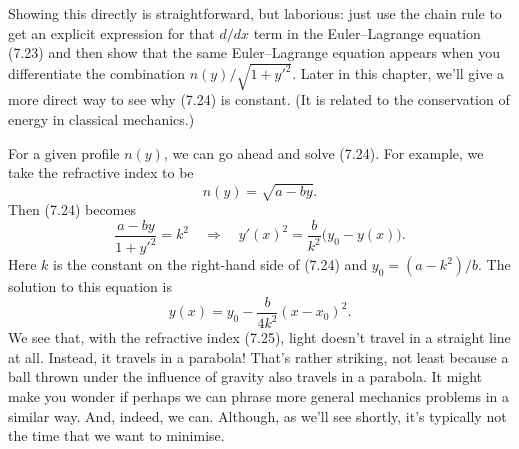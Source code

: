 \documentclass[11pt,a4paper,twoside]{article}
\newcommand{\pnum}[1]{\makebox[0pt][r]{\scriptsize\textbf{[#1]}\hspace{0.7em}}}
\begin{document}
\noindent\pnum{38}Showing this directly is straightforward, but laborious: just use the chain rule to get an explicit expression for that $d/dx$ term in the Euler--Lagrange equation (7.23) and then show that the same Euler--Lagrange equation appears when you differentiate the combination $n(y)/\sqrt{1+y'^2}$. Later in this chapter, we'll give a more direct way to see why (7.24) is constant. (It is related to the conservation of energy in classical mechanics.)

\noindent\pnum{39}For a given profile $n(y)$, we can go ahead and solve (7.24). For example, we take the refractive index to be
\begin{equation}
    n(y)=\sqrt{a-by}.
    \tag{7.25}
\end{equation}
\noindent\pnum{40}Then (7.24) becomes
\begin{equation}
    \frac{a-by}{1+y'^2}=k^2
    \quad\Longrightarrow\quad
    y'(x)^2=\frac{b}{k^2}\bigl(y_0-y(x)\bigr).
    \tag{7.26}
\end{equation}
\noindent\pnum{41}Here $k$ is the constant on the right-hand side of (7.24) and $y_0=(a-k^2)/b$. The solution to this equation is
\begin{equation}
    y(x)=y_0-\frac{b}{4k^2}(x-x_0)^2.
    \tag{7.27}
\end{equation}
\noindent\pnum{42}We see that, with the refractive index (7.25), light doesn't travel in a straight line at all. Instead, it travels in a parabola! That's rather striking, not least because a ball thrown under the influence of gravity also travels in a parabola. It might make you wonder if perhaps we can phrase more general mechanics problems in a similar way. And, indeed, we can. Although, as we'll see shortly, it's typically not the time that we want to minimise.
\end{document}
